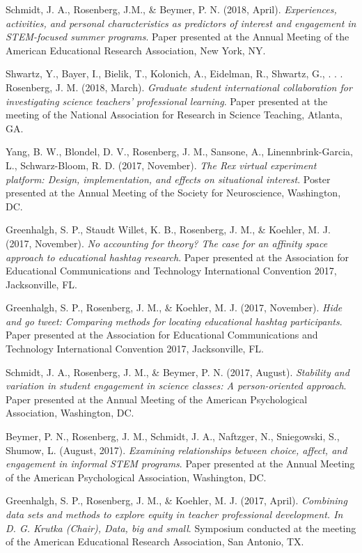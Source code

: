 \documentclass[14,]{article}
\begin{document}
Schmidt, J. A., Rosenberg, J.M., \& Beymer, P. N. (2018, April).
\emph{Experiences, activities, and personal characteristics as
predictors of interest and engagement in STEM-focused summer programs}.
Paper presented at the Annual Meeting of the American Educational
Research Association, New York, NY.

Shwartz, Y., Bayer, I., Bielik, T., Kolonich, A., Eidelman, R., Shwartz,
G., . . . Rosenberg, J. M. (2018, March). \emph{Graduate student
international collaboration for investigating science teachers'
professional learning}. Paper presented at the meeting of the National
Association for Research in Science Teaching, Atlanta, GA.

Yang, B. W., Blondel, D. V., Rosenberg, J. M., Sansone, A.,
Linennbrink-Garcia, L., Schwarz-Bloom, R. D. (2017, November). \emph{The
Rex virtual experiment platform: Design, implementation, and effects on
situational interest}. Poster presented at the Annual Meeting of the
Society for Neuroscience, Washington, DC.

Greenhalgh, S. P., Staudt Willet, K. B., Rosenberg, J. M., \& Koehler,
M. J. (2017, November). \emph{No accounting for theory? The case for an
affinity space approach to educational hashtag research}. Paper
presented at the Association for Educational Communications and
Technology International Convention 2017, Jacksonville, FL.

Greenhalgh, S. P., Rosenberg, J. M., \& Koehler, M. J. (2017, November).
\emph{Hide and go tweet: Comparing methods for locating educational
hashtag participants}. Paper presented at the Association for
Educational Communications and Technology International Convention 2017,
Jacksonville, FL.

Schmidt, J. A., Rosenberg, J. M., \& Beymer, P. N. (2017, August).
\emph{Stability and variation in student engagement in science classes:
A person-oriented approach}. Paper presented at the Annual Meeting of
the American Psychological Association, Washington, DC.

Beymer, P. N., Rosenberg, J. M., Schmidt, J. A., Naftzger, N.,
Sniegowski, S., Shumow, L. (August, 2017). \emph{Examining relationships
between choice, affect, and engagement in informal STEM programs}. Paper
presented at the Annual Meeting of the American Psychological
Association, Washington, DC.

Greenhalgh, S. P., Rosenberg, J. M., \& Koehler, M. J. (2017, April).
\emph{Combining data sets and methods to explore equity in teacher
professional development. In D. G. Krutka (Chair), Data, big and small}.
Symposium conducted at the meeting of the American Educational Research
Association, San Antonio, TX.
\end{document}
